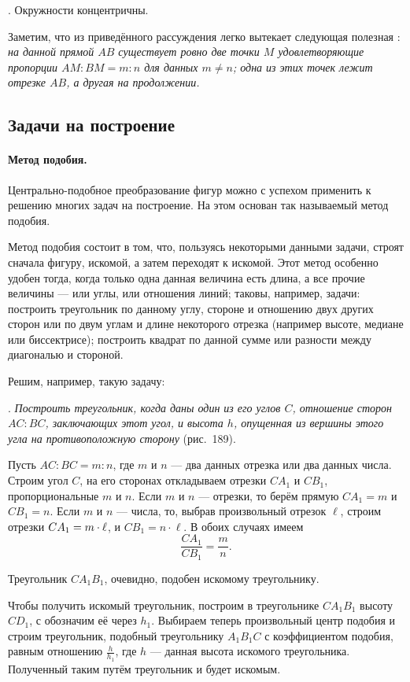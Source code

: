 \documentclass[twoside]{book}
\begin{document}
\smallskip
{}.
Окружности концентричны.

\smallskip

Заметим, что из приведённого рассуждения легко вытекает следующая полезная :
\emph{на данной прямой $AB$ существует ровно две точки $M$ удовлетворяющие пропорции $AM:BM=m:n$ для данных $m\ne n$;
одна из этих точек лежит отрезке $AB$, а другая на продолжении. 
}

\subsection*{Задачи на построение}

\paragraph{Метод подобия.}\label{1938/181}
Центрально-подобное преобразование фигур можно с успехом применить к решению многих задач на построение.
На этом основан так называемый метод подобия.

Метод подобия состоит в том, что, пользуясь некоторыми данными задачи, строят сначала фигуру,  искомой, а затем переходят к искомой.
Этот метод особенно удобен тогда, когда только одна данная величина есть длина, а все прочие величины — или углы, или отношения линий;
таковы, например, задачи:
построить треугольник по данному углу, стороне и отношению двух других сторон или по двум углам и длине некоторого отрезка (например высоте, медиане или биссектрисе);
построить квадрат по данной сумме или разности между диагональю и стороной.

Решим, например, такую задачу:

\smallskip
{}.
\emph{Построить треугольник, когда даны один из его углов $C$, отношение сторон $AC:BC$, заключающих этот угол, и высота $h$, опущенная из вершины этого угла на противоположную сторону} (рис.~189).

Пусть $AC:BC=m:n$, где $m$ и $n$ — два данных отрезка или два данных числа.
Строим угол $C$, на его сторонах откладываем отрезки $CA_1$ и $CB_1$, пропорциональные $m$ и $n$.
Если $m$ и $n$ — отрезки, то берём прямую $CA_1=m$ и $CB_1=n$.
Если $m$ и $n$ — числа, то, выбрав произвольный отрезок $\ell$, строим отрезки $CA_1\z=m \cdot \ell$, и $CB_1=n\cdot \ell$.
В обоих случаях имеем
\[\frac{CA_1}{CB_1} = \frac mn.\]

Треугольник $CA_1B_1$, очевидно, подобен искомому треугольнику.

Чтобы получить искомый треугольник, построим в треугольнике $CA_1B_1$ высоту $CD_1$, с обозначим её через $h_1$.
Выбираем теперь произвольный центр подобия и строим треугольник, подобный треугольнику $A_1B_1C$ с коэффициентом подобия, равным отношению $\tfrac{h}{h_1}$,
где $h$ — данная высота искомого треугольника.
Полученный таким путём треугольник и будет искомым.
\end{document}
